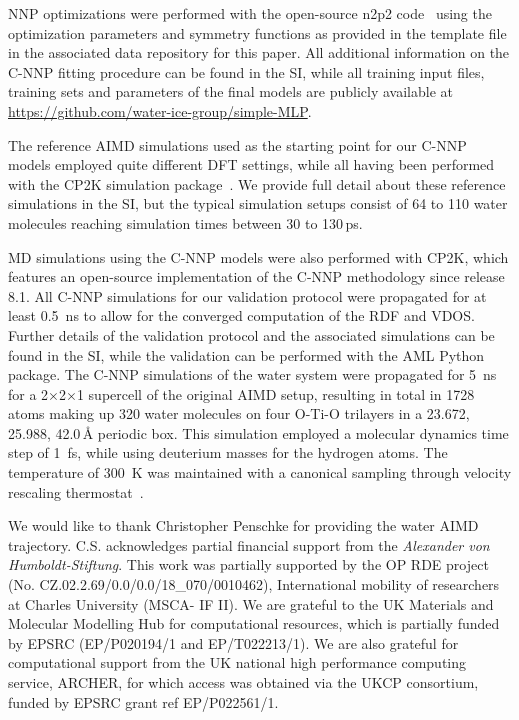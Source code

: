 \documentclass[aip,jcp,amsmath,amssymb,floatfix,reprint,citeautoscript,noeprint]{revtex4-1}
\begin{document}
\begin{bibunit}
%
NNP optimizations were performed with the
open-source n2p2 code~\cite{Singraber2019/10.1021/acs.jctc.8b01092}
using the optimization parameters and symmetry functions as
provided in the template file in the associated data repository
for this paper.
%
All additional information on the C-NNP fitting procedure
can be found in the SI, while all training input files, training sets
and parameters of the final models are publicly available
at \url{https://github.com/water-ice-group/simple-MLP}.

%
The reference AIMD simulations used as the starting point
for our C-NNP models employed
quite different DFT settings, while all having been
performed with the CP2K
simulation package~\cite{Kuhne2020/10.1063/5.0007045}.
%
We provide full detail about these reference simulations
in the SI, but the typical simulation setups consist
of 64 to 110 water molecules reaching simulation times between
30 to 130\,ps.

%
MD simulations using the C-NNP models were also performed with CP2K,
which features an open-source implementation of the C-NNP
methodology since release 8.1.
%
All C-NNP simulations for our validation protocol were propagated
for at least 0.5~ns to allow for the converged computation of
the RDF and VDOS.
%
Further details of the validation protocol and the associated simulations
can be found in the SI, while the validation can be performed
with the AML Python package.
%
The C-NNP simulations of the  water system
were propagated for 5~ns for a 2$\times$2$\times$1 supercell of the original AIMD setup,
resulting in total in 1728 atoms making up 320 water molecules on
four O-Ti-O trilayers in a 23.672, 25.988, 42.0\,\AA{} periodic box.
%
This simulation employed a molecular dynamics time step of 1~fs, while
using deuterium masses for the hydrogen atoms.
%
The temperature of 300~K was maintained with a canonical sampling through velocity rescaling thermostat~\cite{Bussi2007/10.1063/1.2408420}.
%



%
%
\begin{acknowledgments}
%
%
We would like to thank Christopher Penschke for providing the water  AIMD trajectory.
%
C.S. acknowledges partial financial support from the
\textit{Alexander von Humboldt-Stiftung}.
%
This work was partially supported by the OP RDE project (No. CZ.02.2.69/0.0/0.0/18\_070/0010462), International mobility of researchers at Charles University (MSCA- IF II).
%
We are grateful to the UK Materials and Molecular Modelling Hub for computational
resources, which is partially funded by EPSRC (EP/P020194/1 and EP/T022213/1).
%
We are also grateful for computational support from the UK national high performance computing service, ARCHER, for which access was obtained via the UKCP consortium, funded by EPSRC grant ref EP/P022561/1.
%
%
\end{acknowledgments}


%
%
%



\end{bibunit}
\end{document}
